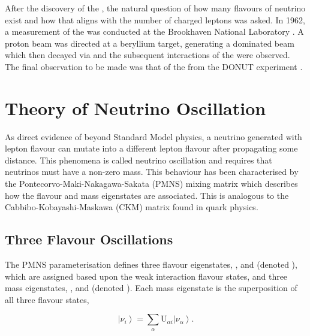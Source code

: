After the discovery of the , the natural question of how many flavours of neutrino exist and how that aligns with the number of charged leptons was asked. In 1962, a measurement of the \quickmath{\nu_{\mu}} was conducted at the Brookhaven National Laboratory \cite{Lederman}. A proton beam was directed at a beryllium target, generating a \quickmath{\pi} dominated beam which then decayed via \quickmath{\pi^{+} \rightarrow \mu^{+} + \nu_{\mu}} and the subsequent interactions of the \quickmath{\nu_{\mu}} were observed. The final observation to be made was that of the \quickmath{\nu_{\tau}} from the DONUT experiment \cite{tau_nu_disc}.

\section{Theory of Neutrino Oscillation}
\label{sec:NeutrinoOscillationPhysics_EvidenceForNeutrinoOscillation}

As direct evidence of beyond Standard Model physics, a neutrino generated with lepton flavour \quickmath{\alpha} can mutate into a different lepton flavour \quickmath{\beta} after propagating some distance. This phenomena is called neutrino oscillation and requires that neutrinos must have a non-zero mass. This behaviour has been characterised by the Pontecorvo-Maki-Nakagawa-Sakata (PMNS) \cite{p1,p2,km} mixing matrix which describes how the flavour and mass eigenstates are associated. This is analogous to the Cabbibo-Kobayashi-Maskawa (CKM) \cite{cabbibo} matrix found in quark physics.

\subsection{Three Flavour Oscillations}
\label{sec:NeutrinoOscillationPhysics_3FlavourOsc}

The PMNS parameterisation defines three flavour eigenstates, , \quickmath{\nu_{\mu}} and \quickmath{\nu_{\tau}} (denoted \quickmath{\nu_{\alpha}}), which are assigned based upon the weak interaction flavour states, and three mass eigenstates, ,  and  (denoted ). Each mass eigenstate is the superposition of all three flavour states,

\begin{equation}
  \label{eq:NeutrinoOscillationPhysics_Superposition}
  \left|\nu_{i}\right> = \sum_{\alpha}\mathrm{U}_{\alpha i}\left|\nu_{\alpha}\right>.
\end{equation}

